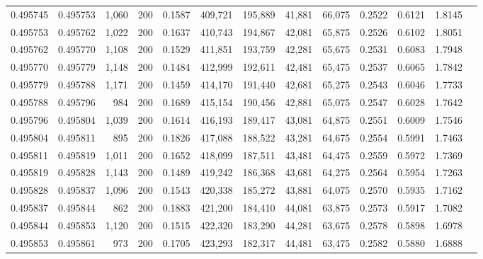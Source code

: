 \begin{tabular}{rrrrrrrrrrrrr}
0.495745 & 0.495753 & 1,060 & 200 &                                     0.1587 & 409,721 & 195,889 &  41,881 &  66,075 & 0.2522 & 0.6121 & 1.8145 \\
0.495753 & 0.495762 & 1,022 & 200 &                                     0.1637 & 410,743 & 194,867 &  42,081 &  65,875 & 0.2526 & 0.6102 & 1.8051 \\
0.495762 & 0.495770 & 1,108 & 200 &                                     0.1529 & 411,851 & 193,759 &  42,281 &  65,675 & 0.2531 & 0.6083 & 1.7948 \\
0.495770 & 0.495779 & 1,148 & 200 &                                     0.1484 & 412,999 & 192,611 &  42,481 &  65,475 & 0.2537 & 0.6065 & 1.7842 \\
0.495779 & 0.495788 & 1,171 & 200 &                                     0.1459 & 414,170 & 191,440 &  42,681 &  65,275 & 0.2543 & 0.6046 & 1.7733 \\
0.495788 & 0.495796 &   984 & 200 &                                     0.1689 & 415,154 & 190,456 &  42,881 &  65,075 & 0.2547 & 0.6028 & 1.7642 \\
0.495796 & 0.495804 & 1,039 & 200 &                                     0.1614 & 416,193 & 189,417 &  43,081 &  64,875 & 0.2551 & 0.6009 & 1.7546 \\
0.495804 & 0.495811 &   895 & 200 &                                     0.1826 & 417,088 & 188,522 &  43,281 &  64,675 & 0.2554 & 0.5991 & 1.7463 \\
0.495811 & 0.495819 & 1,011 & 200 &                                     0.1652 & 418,099 & 187,511 &  43,481 &  64,475 & 0.2559 & 0.5972 & 1.7369 \\
0.495819 & 0.495828 & 1,143 & 200 &                                     0.1489 & 419,242 & 186,368 &  43,681 &  64,275 & 0.2564 & 0.5954 & 1.7263 \\
0.495828 & 0.495837 & 1,096 & 200 &                                     0.1543 & 420,338 & 185,272 &  43,881 &  64,075 & 0.2570 & 0.5935 & 1.7162 \\
0.495837 & 0.495844 &   862 & 200 &                                     0.1883 & 421,200 & 184,410 &  44,081 &  63,875 & 0.2573 & 0.5917 & 1.7082 \\
0.495844 & 0.495853 & 1,120 & 200 &                                     0.1515 & 422,320 & 183,290 &  44,281 &  63,675 & 0.2578 & 0.5898 & 1.6978 \\
0.495853 & 0.495861 &   973 & 200 &                                     0.1705 & 423,293 & 182,317 &  44,481 &  63,475 & 0.2582 & 0.5880 & 1.6888 \\

\end{tabular}
